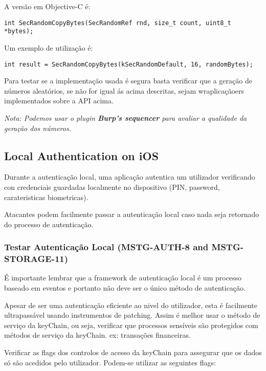  
A versão em Objective-C é:
\begin{lstlisting}[basicstyle=\small,]
 int SecRandomCopyBytes(SecRandomRef rnd, size_t count, uint8_t *bytes);
\end{lstlisting}
Um exemplo de utilização é:
\begin{lstlisting}[basicstyle=\small,]
  int result = SecRandomCopyBytes(kSecRandomDefault, 16, randomBytes);
\end{lstlisting}

Para testar se a implementação usada é segura basta verificar que a geração de números aleatórios, se não for igual ás acima descritas, sejam wraplicaçãoers implementados sobre a API acima. 

\textit{Nota: Podemos usar o plugin \textbf{Burp's sequencer} para avaliar a qualidade da geração dos números.}


\subsection{Local Authentication on iOS}
\hfill\par
Durante a autenticação local, uma aplicação autentica um utilizador verificando con credenciais guardadas localmente no dispositivo (PIN, password, carateristicas biometricas).

Atacantes podem facilmente passar a autenticação local caso nada seja retornado do processo de autenticação.


\subsubsection{Testar Autenticação Local (MSTG-AUTH-8 and MSTG-STORAGE-11)}
\hfill\par
\hfill\par
É importante lembrar que a framework de autenticação local é um processo baseado em eventos e portanto não deve ser o único método de autenticação.\par
\hfill\par


Apesar de ser uma autenticação eficiente ao nivel do utilizador, esta é facilmente ultrapassável usando instrumentos de patching. Assim é melhor usar o método de serviço da keyChain, ou seja, verificar que processos sensíveis são protegidos com métodos de serviço da keyChain. ex: transações financeiras.\par

Verificar as flags dos controlos de acesso da keyChain para assegurar que os dados só são acedidos pelo utilizador. Podem-se utilizar as seguintes flags: 

